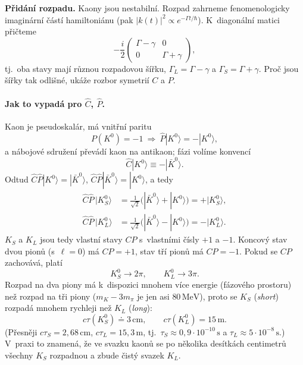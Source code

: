 \textbf{Přidání rozpadu.} Kaony jsou nestabilní. Rozpad zahrneme fenomenologicky imaginární částí hamiltoniánu (pak $|k(t)|^2\propto e^{-\Gamma t/\hbar}$). K~diagonální matici přičteme
\begin{equation}
  -\frac{i}{2}\begin{pmatrix} \Gamma - \gamma & 0\\ 0 & \Gamma + \gamma\end{pmatrix},
\end{equation}
tj.\ oba stavy mají různou rozpadovou šířku, $\Gamma_L = \Gamma-\gamma$ a $\Gamma_S=\Gamma+\gamma$. Proč jsou šířky tak odlišné, ukáže rozbor symetrií $C$ a $P$.

\paragraph{Jak to vypadá pro $\hat C$, $\hat P$.}
Kaon je pseudoskalár, má vnitřní paritu
\begin{equation}
  P(K^0) = -1 \ \Rightarrow\ \hat P|K^0\rangle = -|K^0\rangle,
\end{equation}
a nábojové sdružení převádí kaon na antikaon; fázi volíme konvencí
\begin{equation}
  \hat C|K^0\rangle \equiv -|\bar K^0\rangle .
\end{equation}
Odtud $\hat C\hat P|K^0\rangle = |\bar K^0\rangle$, $\hat C\hat P|\bar K^0\rangle = |K^0\rangle$, a tedy
\begin{align}
  \hat C\hat P\,|K^0_S\rangle &= \tfrac{1}{\sqrt2}\big(|\bar K^0\rangle + |K^0\rangle\big) = +|K^0_S\rangle,\\
  \hat C\hat P\,|K^0_L\rangle &= \tfrac{1}{\sqrt2}\big(|\bar K^0\rangle - |K^0\rangle\big) = -|K^0_L\rangle .
\end{align}
$K_S$ a $K_L$ jsou tedy vlastní stavy $CP$ s~vlastními čísly $+1$ a $-1$. Koncový stav dvou pionů (s~$\ell=0$) má $CP=+1$, stav tří pionů má $CP=-1$. Pokud se $CP$ zachovává, platí
\begin{equation}
  K^0_S \to 2\pi, \qquad K^0_L \to 3\pi .
\end{equation}
Rozpad na dva piony má k~dispozici mnohem více energie (fázového prostoru) než rozpad na tři piony ($m_K - 3m_\pi$ je jen asi $80\,\mathrm{MeV}$), proto se $K_S$ (\emph{short}) rozpadá mnohem rychleji než $K_L$ (\emph{long}):
\begin{equation}
  c\tau(K^0_S) \doteq 3\,\mathrm{cm}, \qquad c\tau(K^0_L) = 15\,\mathrm{m}.
\end{equation}
(Přesněji $c\tau_S=2{,}68\,\mathrm{cm}$, $c\tau_L=15{,}3\,\mathrm{m}$, tj.\ $\tau_S\approx 0{,}9\cdot10^{-10}\,\mathrm{s}$ a $\tau_L\approx5\cdot10^{-8}\,\mathrm{s}$.) V~praxi to znamená, že ve svazku kaonů se po několika desítkách centimetrů všechny $K_S$ rozpadnou a zbude čistý svazek $K_L$.

